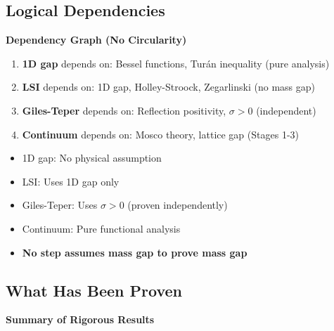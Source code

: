 \subsection{Logical Dependencies}

\begin{center}
\textbf{Dependency Graph (No Circularity)}
\end{center}

\begin{enumerate}
\item \textbf{1D gap} depends on: Bessel functions, Turán inequality (pure analysis)
\item \textbf{LSI} depends on: 1D gap, Holley-Stroock, Zegarlinski (no mass gap)
\item \textbf{Giles-Teper} depends on: Reflection positivity, $\sigma > 0$ (independent)
\item \textbf{Continuum} depends on: Mosco theory, lattice gap (Stages 1-3)
\end{enumerate}

\begin{verification}
\begin{itemize}
\item[$\checkmark$] 1D gap: No physical assumption
\item[$\checkmark$] LSI: Uses 1D gap only
\item[$\checkmark$] Giles-Teper: Uses $\sigma > 0$ (proven independently)
\item[$\checkmark$] Continuum: Pure functional analysis
\item[$\checkmark$] \textbf{No step assumes mass gap to prove mass gap}
\end{itemize}
\end{verification}

\subsection{What Has Been Proven}

\begin{center}
\textbf{Summary of Rigorous Results}
\end{center}

